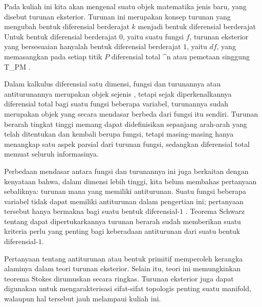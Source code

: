 \setcounter{section}{20}


Pada kuliah ini kita akan mengenal suatu objek matematika jenis baru, yang disebut turunan eksterior. Turunan ini merupakan konsep turunan yang mengubah bentuk diferensial berderajat $k$ menjadi bentuk diferensial berderajat
 Untuk bentuk diferensial berderajat $0$, yaitu suatu fungsi $f$, turunan eksterior yang bersesuaian hanyalah bentuk diferensial berderajat $1$, yaitu $df$, yang memasangkan pada setiap titik $P$
 {} {}
diferensial total
 { \R^n } { \R
} {}
atau
 {} {}
pemetaan singgung
 {T_PM} {\R
} {.}

Dalam kalkulus diferensial satu dimensi, fungsi dan turunannya atau antiturunannya merupakan objek sejenis
 {} {,}
tetapi sejak diperkenalkannya diferensial total bagi suatu fungsi beberapa variabel, turunannya sudah merupakan objek yang secara mendasar berbeda dari fungsi itu sendiri. Turunan berarah tingkat tinggi memang dapat didefinisikan sepanjang arah-arah yang telah ditentukan dan kembali berupa fungsi, tetapi masing-masing hanya menangkap satu aspek parsial dari turunan fungsi, sedangkan diferensial total memuat seluruh informasinya.

Perbedaan mendasar antara fungsi dan turunannya ini juga berkaitan dengan kenyataan bahwa, dalam dimensi lebih tinggi, kita belum membahas pertanyaan sebaliknya: turunan mana yang memiliki antiturunan. Suatu fungsi beberapa variabel tidak dapat memiliki antiturunan dalam pengertian ini; pertanyaan tersebut hanya bermakna bagi suatu bentuk diferensial-$1$
 {} {.}
Teorema Schwarz tentang dapat dipertukarkannya turunan berarah sudah memberikan suatu kriteria perlu yang penting bagi keberadaan antiturunan dari suatu bentuk diferensial-$1$.

Pertanyaan tentang antiturunan atau bentuk primitif memperoleh kerangka alaminya dalam teori turunan eksterior. Selain itu, teori ini memungkinkan teorema Stokes dirumuskan secara ringkas. Turunan eksterior juga dapat digunakan untuk mengarakterisasi sifat-sifat topologis penting suatu manifold, walaupun hal tersebut jauh melampaui kuliah ini.

